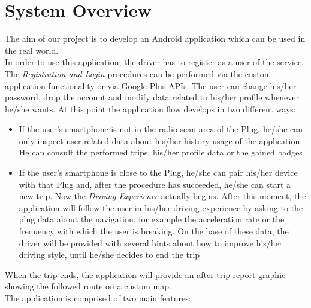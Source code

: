 \chapter{System Overview} \label{chap2}
The aim of our project is to develop an Android application which can be used in the real world.\\
In order to use this application, the driver has to register as a user of the service. The \textit{Registration and Login} procedures can be performed via the custom application functionality or via Google Plus APIs.
The user can change his/her password, drop the account and modify data related to his/her profile whenever he/she wants.
At this point the application flow develops in two different ways:

\begin{itemize}
	\item If the user's smartphone is not in the radio scan area of the Plug, he/she can only inspect user related data about his/her history usage of the application. He can consult the performed trips, his/her profile data or the gained badges
	\item If the user's smartphone is close to the Plug, he/she can pair his/her device with that Plug and, after the procedure has succeeded, he/she can start a new trip. Now the \textit{Driving Experience} actually begins. After this moment, the application will follow the user in his/her driving experience by asking to the plug data about the navigation, for example the acceleration rate or the frequency with which the user is breaking. On the base of these data, the driver will be provided with several hints about how to improve his/her driving style, until he/she decides to end the trip
\end{itemize}
When the trip ends, the application will provide an after trip report graphic showing the followed route on a custom map.\\	
The application is comprised of two main features:

